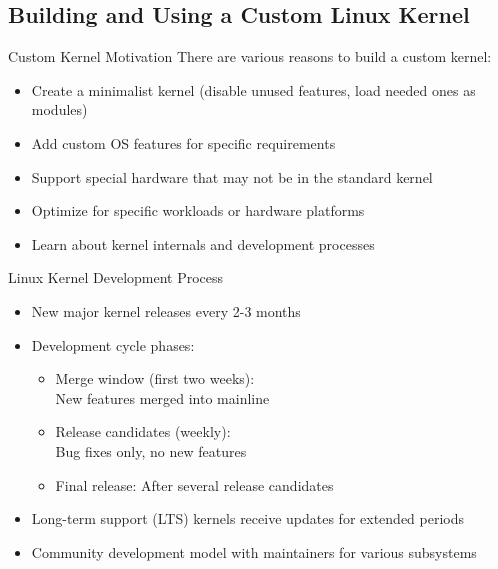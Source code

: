 \subsection{Building and Using a Custom Linux Kernel}

\begin{concept}{Custom Kernel Motivation}
    There are various reasons to build a custom kernel:
    \begin{itemize}
        \item Create a minimalist kernel (disable unused features, load needed ones as modules)
        \item Add custom OS features for specific requirements
        \item Support special hardware that may not be in the standard kernel
        \item Optimize for specific workloads or hardware platforms
        \item Learn about kernel internals and development processes
    \end{itemize}
\end{concept}


\begin{definition}{Linux Kernel Development Process}
    \begin{itemize}
        \item New major kernel releases every 2-3 months
        \item Development cycle phases:
            \begin{itemize}
                \item Merge window (first two weeks): \\ New features merged into mainline
                \item Release candidates (weekly): \\ Bug fixes only, no new features
                \item Final release: After several release candidates
            \end{itemize}
        \item Long-term support (LTS) kernels receive updates for extended periods
        \item Community development model with maintainers for various subsystems
    \end{itemize}
\end{definition}


